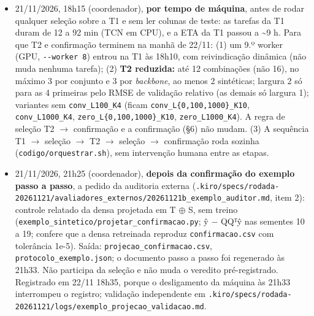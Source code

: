 \documentclass[11pt,a4paper]{article}
\begin{document}
\begin{itemize}
\item 21/11/2026, 18h15 (coordenador), \textbf{por tempo de máquina}, antes de rodar qualquer seleção sobre a T1 e sem ler colunas de teste: as tarefas da T1 duram de 12 a 92 min (TCN em CPU), e a ETA da T1 passou a \textasciitilde{}9 h. Para que T2 e confirmação terminem na manhã de 22/11: (1) um 9.º worker (GPU, \texttt{-\allowbreak{}-\allowbreak{}worker 8}) entrou na T1 às 18h10, com reivindicação dinâmica (não muda nenhuma tarefa); (2) \textbf{T2 reduzida:} até 12 combinações (não 16), no máximo 3 por conjunto e 3 por \emph{backbone}, ao menos 2 sintéticas; largura 2 só para as 4 primeiras pelo RMSE de validação relativo (as demais só largura 1); variantes sem \texttt{conv\_\allowbreak{}L100\_\allowbreak{}K4} (ficam \texttt{conv\_\allowbreak{}L\{0,100,1000\}\_\allowbreak{}K10}, \texttt{conv\_\allowbreak{}L1000\_\allowbreak{}K4}, \texttt{zero\_\allowbreak{}L\{0,100,1000\}\_\allowbreak{}K10}, \texttt{zero\_\allowbreak{}L1000\_\allowbreak{}K4}). A regra de seleção T2 $\to$ confirmação e a confirmação (\S{}6) não mudam. (3) A sequência T1 $\to$ seleção $\to$ T2 $\to$ seleção $\to$ confirmação roda sozinha (\texttt{codigo/\allowbreak{}orquestrar.\allowbreak{}sh}), sem intervenção humana entre as etapas.
\item 21/11/2026, 21h25 (coordenador), \textbf{depois da confirmação do exemplo passo a passo}, a pedido da auditoria externa (\texttt{.\allowbreak{}kiro/\allowbreak{}specs/\allowbreak{}rodada-\allowbreak{}20261121/\allowbreak{}avaliadores\_\allowbreak{}externos/\allowbreak{}20261121b\_\allowbreak{}exemplo\_\allowbreak{}auditor.\allowbreak{}md}, item 2): controle relatado da densa projetada em T $\oplus$ S, sem treino (\texttt{exemplo\_\allowbreak{}sintetico/\allowbreak{}projetar\_\allowbreak{}confirmacao.\allowbreak{}py}; ŷ $-$ QQᵀŷ nas sementes 10 a 19; confere que a densa retreinada reproduz \texttt{confirmacao.\allowbreak{}csv} com tolerância 1e-5). Saída: \texttt{projecao\_\allowbreak{}confirmacao.\allowbreak{}csv}, \texttt{protocolo\_\allowbreak{}exemplo.\allowbreak{}json}; o documento passo a passo foi regenerado às 21h33. Não participa da seleção e não muda o veredito pré-registrado. Registrado em 22/11 18h35, porque o desligamento da máquina às 21h33 interrompeu o registro; validação independente em \texttt{.\allowbreak{}kiro/\allowbreak{}specs/\allowbreak{}rodada-\allowbreak{}20261121/\allowbreak{}logs/\allowbreak{}exemplo\_\allowbreak{}projecao\_\allowbreak{}validacao.\allowbreak{}md}.

\end{itemize}
\end{document}
